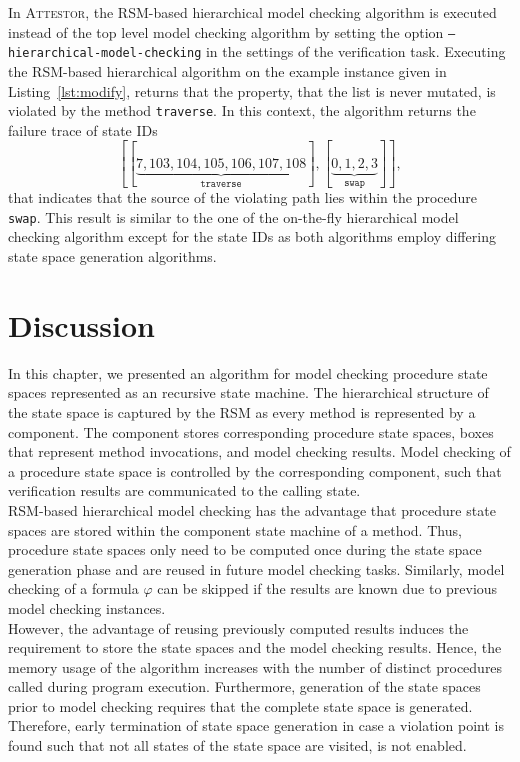 \documentclass[a4paper, 12pt, twoside]{report}
\begin{document}
	In \textsc{Attestor}, the RSM-based hierarchical model checking algorithm is executed instead of the top level model checking algorithm by setting the option \texttt{--hierarchical-model-checking} in the settings of the verification task. Executing the RSM-based hierarchical algorithm on the example instance given in Listing~\ref{lst:modify}, returns that the property, that the list is never mutated, is violated by the method \texttt{traverse}. In this context, the algorithm returns the failure trace of state IDs \[[[\underbrace{7, 103, 104, 105, 106, 107, 108}_{\texttt{traverse}}], [\underbrace{0, 1, 2, 3}_{\texttt{swap}}]],\] that indicates that the source of the violating path lies within the procedure \texttt{swap}. This result is similar to the one of the on-the-fly hierarchical model checking algorithm except for the state IDs as both algorithms employ differing state space generation algorithms. 
	
	\section{Discussion}
	
	In this chapter, we presented an algorithm for model checking procedure state spaces represented as an recursive state machine. The hierarchical structure of the state space is captured by the RSM as every method is represented by a component. The component stores corresponding procedure state spaces, boxes that represent method invocations, and model checking results. Model checking of a procedure state space is controlled by the corresponding component, such that verification results are communicated to the calling state. \\
	
	RSM-based hierarchical model checking has the advantage that procedure state spaces are stored within the component state machine of a method. Thus, procedure state spaces only need to be computed once during the state space generation phase and are reused in future model checking tasks. Similarly, model checking of a formula $\varphi$ can be skipped if the results are known due to previous model checking instances.\\	
	
	However, the advantage of reusing previously computed results induces the requirement to store the state spaces and the model checking results. Hence, the memory usage of the algorithm increases with the number of distinct procedures called during program execution. Furthermore, generation of the state spaces prior to model checking requires that the complete state space is generated. Therefore, early termination of state space generation in case a violation point is found such that not all states of the state space are visited, is not enabled.\\	
	
\end{document}
